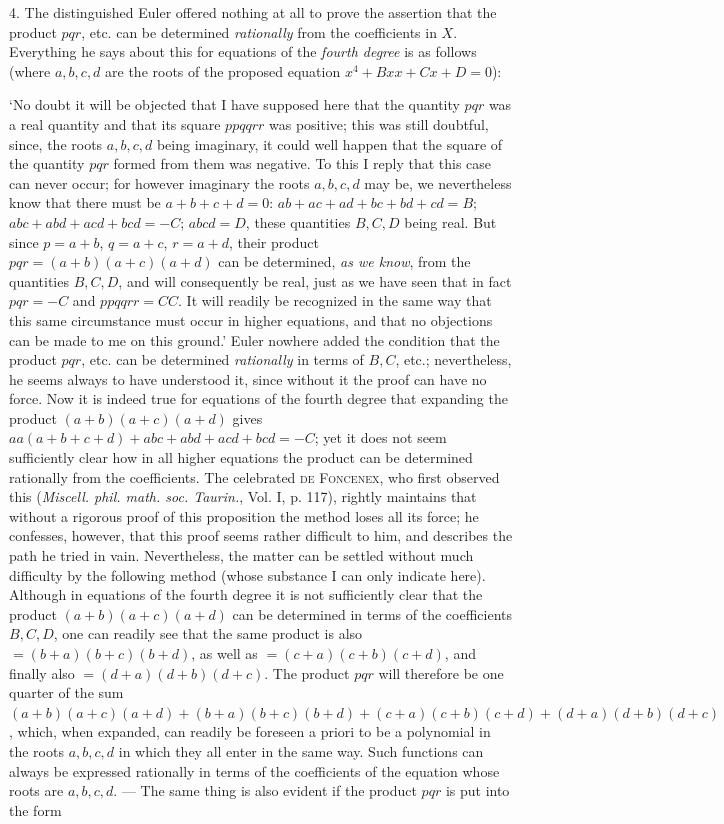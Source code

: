 4. The distinguished Euler offered nothing at all to prove the assertion that the product $pqr$, etc. can be determined \textit{rationally} from the coefficients in $X$. Everything he says about this for equations of the \textit{fourth degree} is as follows (where $a,b,c,d$ are the roots of the proposed equation $x^4+Bxx+Cx+D=0$):

\lq No doubt it will be objected that I have supposed here that the quantity $pqr$ was a real quantity and that its square $ppqqrr$ was positive; this was still doubtful, since, the roots $a,b,c,d$ being imaginary, it could well happen that the square of the quantity $pqr$ formed from them was negative. To this I reply that this case can never occur; for however imaginary the roots $a,b,c,d$ may be, we nevertheless know that there must be $a+b+c+d=0$: $ab+ac+ad+bc+bd+cd=B$; $abc+abd+acd+bcd=-C$; $abcd=D$, these quantities $B,C,D$ being real. But since $p=a+b$, $q=a+c$, $r=a+d$, their product $pqr=(a+b)(a+c)(a+d)$ can be determined, \textit{as we know}, from the quantities $B,C,D$, and will consequently be real, just as we have seen that in fact $pqr=-C$ and $ppqqrr=CC$. It will readily be recognized in the same way that this same circumstance must occur in higher equations, and that no objections can be made to me on this ground.\rq{}
Euler nowhere added the condition that the product $pqr$, etc. can be determined \textit{rationally} in terms of $B,C$, etc.; nevertheless, he seems always to have understood it, since without it the proof can have no force. Now it is indeed true for equations of the fourth degree that expanding the product $(a+b)(a+c)(a+d)$ gives $aa(a+b+c+d)+abc+abd+acd+bcd=-C$; yet it does not seem sufficiently clear how in all higher equations the product can be determined rationally from the coefficients. The celebrated \textsc{de Foncenex}, who first observed this (\textit{Miscell. phil. math. soc. Taurin.}, Vol. I, p. 117), rightly maintains that without a rigorous proof of this proposition the method loses all its force; he confesses, however, that this proof seems rather difficult to him, and describes the path he tried in vain. Nevertheless, the matter can be settled without much difficulty by the following method (whose substance I can only indicate here). Although in equations of the fourth degree it is not sufficiently clear that the product $(a+b)(a+c)(a+d)$ can be determined in terms of the coefficients $B,C,D$, one can readily see that the same product is also $=(b+a)(b+c)(b+d)$, as well as $=(c+a)(c+b)(c+d)$, and finally also $=(d+a)(d+b)(d+c)$. The product $pqr$ will therefore be one quarter of the sum $(a+b)(a+c)(a+d)+(b+a)(b+c)(b+d)+(c+a)(c+b)(c+d)+(d+a)(d+b)(d+c)$, which, when expanded, can readily be foreseen a priori to be a polynomial in the roots $a,b,c,d$ in which they all enter in the same way. Such functions can always be expressed rationally in terms of the coefficients of the equation whose roots are $a,b,c,d$. --- The same thing is also evident if the product $pqr$ is put into the form
